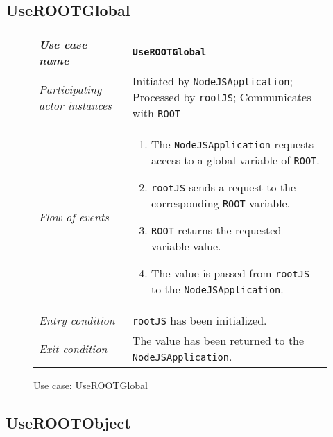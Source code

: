 \subsection{UseROOTGlobal}

\begin{figure}[htb]
	\centering
	\begin{longtable}{p{3cm} @{\hskip 1cm} p{12cm}}
		\hline

		\textit{Use case name} & \texttt{UseROOTGlobal}\\
		\hline

		\textit{Participating actor instances} & Initiated by \texttt{NodeJSApplication}; Processed by \texttt{rootJS}; Communicates with \texttt{ROOT}\\
		\hline

		\textit{Flow of events} &
			\begin{enumerate}
				\item The \texttt{NodeJSApplication} requests access to a global variable of \texttt{ROOT}.

				\item \texttt{rootJS} sends a request to the corresponding \texttt{ROOT} variable.

				\item \texttt{ROOT} returns the requested variable value.

	            \item The value is passed from \texttt{rootJS} to the \texttt{NodeJSApplication}.
			\end{enumerate}
			\\
		\hline

		\textit{Entry condition} & \texttt{rootJS} has been initialized.\\
		\hline

		\textit{Exit condition} & The value has been returned to the \texttt{NodeJSApplication}.\\
        \hline
	\end{longtable}

	\caption{Use case: UseROOTGlobal}
\end{figure}

\pagebreak

\subsection{UseROOTObject}

